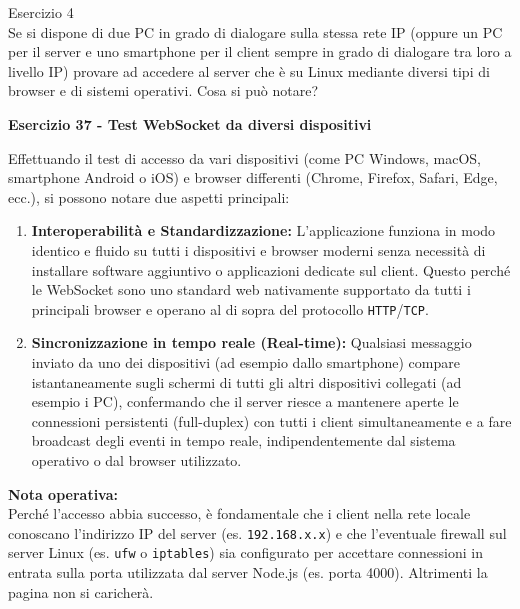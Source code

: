 \documentclass[11pt]{article}
\begin{document}
\begin{tcolorbox}[colback=blue!5!white,colframe=blue!75!black,title=\textbf{DOMANDA}, breakable]
Esercizio 4\\
Se si dispone di due PC in grado di dialogare sulla stessa rete IP (oppure un PC per il server e uno smartphone per il client sempre in grado di dialogare tra loro a livello IP) provare ad accedere al server che è su Linux mediante diversi tipi di browser e di sistemi operativi. Cosa si può notare?
\end{tcolorbox}

\begin{tcolorbox}[colback=green!5!white,colframe=green!75!black,title=\textbf{RISPOSTA}, breakable]
\textbf{Esercizio 37 - Test WebSocket da diversi dispositivi}

Effettuando il test di accesso da vari dispositivi (come PC Windows, macOS, smartphone Android o iOS) e browser differenti (Chrome, Firefox, Safari, Edge, ecc.), si possono notare due aspetti principali:

\begin{enumerate}
    \item \textbf{Interoperabilità e Standardizzazione:} L'applicazione funziona in modo identico e fluido su tutti i dispositivi e browser moderni senza necessità di installare software aggiuntivo o applicazioni dedicate sul client. Questo perché le WebSocket sono uno standard web nativamente supportato da tutti i principali browser e operano al di sopra del protocollo \texttt{HTTP}/\texttt{TCP}.
    \item \textbf{Sincronizzazione in tempo reale (Real-time):} Qualsiasi messaggio inviato da uno dei dispositivi (ad esempio dallo smartphone) compare istantaneamente sugli schermi di tutti gli altri dispositivi collegati (ad esempio i PC), confermando che il server riesce a mantenere aperte le connessioni persistenti (full-duplex) con tutti i client simultaneamente e a fare broadcast degli eventi in tempo reale, indipendentemente dal sistema operativo o dal browser utilizzato.
\end{enumerate}

\textbf{Nota operativa:} \\
Perché l'accesso abbia successo, è fondamentale che i client nella rete locale conoscano l'indirizzo IP del server (es. \texttt{192.168.x.x}) e che l'eventuale firewall sul server Linux (es. \texttt{ufw} o \texttt{iptables}) sia configurato per accettare connessioni in entrata sulla porta utilizzata dal server Node.js (es. porta 4000). Altrimenti la pagina non si caricherà.
\end{tcolorbox}
\end{document}
